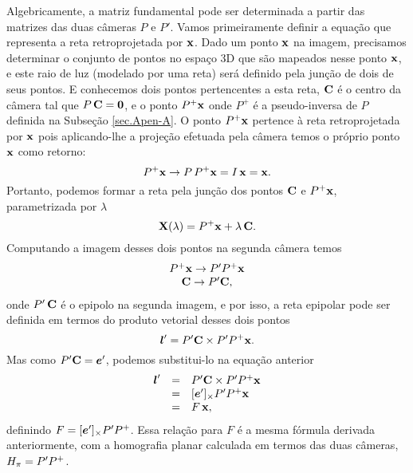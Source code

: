 Algebricamente, a matriz fundamental pode ser determinada a partir das matrizes das duas câmeras $P$ e $P'$. Vamos primeiramente definir a equação que representa a reta retroprojetada por $\mathbf{x}$. Dado um ponto $\mathbf{x}$ na imagem, precisamos determinar o conjunto de pontos no espaço 3D que são mapeados nesse ponto $\mathbf{x}$, e este raio de luz (modelado por uma reta) será definido pela junção de dois de seus pontos. E conhecemos dois pontos pertencentes a esta reta, ${\bf C}$ é o centro da câmera tal que $P\,{\bf C}={\bf 0}$, e o ponto $P^+\mathbf{x}$ onde $P^+$ é a pseudo-inversa de $P$ definida na Subseção \ref{sec.Apen-A}. O ponto $P^+\mathbf{x}$ pertence à reta retroprojetada por $\mathbf{x}$ pois aplicando-lhe a projeção efetuada pela câmera temos o próprio ponto $\mathbf{x}$ como retorno:
\begin{equation*}
P^+\mathbf{x} \rightarrow P\,P^+\mathbf{x}=I\,\mathbf{x}=\mathbf{x}.
\end{equation*}
Portanto, podemos formar a reta pela junção dos pontos ${\bf C}$ e $P^+\mathbf{x}$, parametrizada por $\lambda$
\begin{equation*}
\mathbf{X}(\lambda)=P^+\mathbf{x}+\lambda\,{\bf C}.
\end{equation*}
Computando a imagem desses dois pontos na segunda câmera temos
\begin{equation*}
\begin{array}{c}
P^+\mathbf{x} \rightarrow P'P^+\mathbf{x}\\
{\bf C} \rightarrow P'{\bf C},
\end{array}
\end{equation*}
onde $P'\,{\bf C}$ é o epipolo na segunda imagem, e por isso, a reta epipolar pode ser definida em termos do produto vetorial desses dois pontos
\begin{equation}\label{eq.reta-epipolar-funcao-cameras}
\boldsymbol{l}'=P'{\bf C} \times P'P^+\mathbf{x}.
\end{equation}
Mas como $P'{\bf C}=\boldsymbol{e}'$, podemos substitui-lo na equação anterior
\begin{equation*}
\begin{array}{rcl}
\boldsymbol{l}'&=&P'{\bf C} \times P'P^+\mathbf{x}\\
&=&[\boldsymbol{e}']_\times P'P^+\mathbf{x}\\
&=&F\,\mathbf{x},
\end{array}
\end{equation*}
definindo $F=[\boldsymbol{e}']_\times P'P^+$. Essa relação para $F$ é a mesma fórmula derivada anteriormente, com a homografia planar calculada em termos das duas câmeras, $H_{\pi}=P'P^+$.


